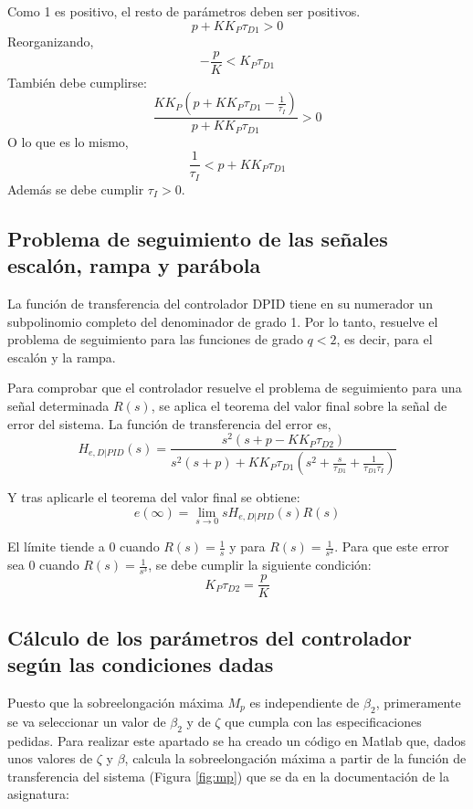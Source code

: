 \documentclass[a4paper]{article}
\begin{document}
Como 1 es positivo, el resto de parámetros deben ser positivos.
\begin{equation}
	p+K K_P \tau_{D1}>0
\end{equation}
Reorganizando,
\begin{equation}
	-\frac{p}{K}<K_P \tau_{D1}
	\label{eq:2}
\end{equation}
También debe cumplirse:
\begin{equation}
	\frac{K K_P (p+K K_P \tau_{D1} -\frac{1}{\tau_I})}{p+K K_P \tau_{D1}} > 0
\end{equation}
O lo que es lo mismo,
\begin{equation}
	\frac{1}{\tau_I} < p+K K_P \tau_{D1}
	\label{eq:3}
\end{equation}
Además se debe cumplir $\tau_I > 0$.

\subsection{Problema de seguimiento de las señales escalón, rampa y parábola}
La función de transferencia del controlador D\textbar PID tiene en su numerador un subpolinomio completo del denominador de grado 1. Por lo tanto, resuelve el problema de seguimiento para las funciones de grado $q<2$, es decir, para el escalón y la rampa.

Para comprobar que el controlador resuelve el problema de seguimiento para una señal determinada $R(s)$, se aplica el teorema del valor final sobre la señal de error del sistema.
La función de transferencia del error es,
\begin{equation}
	H_{e, D|PID}(s)=\frac{s^2(s+p-K K_P \tau_{D2})}{s^2(s+p)+K K_P \tau_{D1}(s^2+\frac{s}{\tau_{D1}}+\frac{1}{\tau_{D1} \tau_I})}
\end{equation}

Y tras aplicarle el teorema del valor final se obtiene:
\begin{equation}
	e(\infty)=\lim_{s \rightarrow 0}
	s H_{e, D|PID}(s) R(s)
\end{equation}

El límite tiende a 0 cuando $R(s)=\frac{1}{s}$ y para $R(s)=\frac{1}{s^2}$. Para que este error sea $0$ cuando $R(s)=\frac{1}{s^3}$, se debe cumplir la siguiente condición:
\begin{equation}
K_P \tau_{D2} = \frac{p}{K}
\end{equation}

\subsection{Cálculo de los parámetros del controlador según las condiciones dadas}
Puesto que la sobreelongación máxima $M_p$ es independiente de $\beta_2$, primeramente se va seleccionar un valor de $\beta_2$ y de $\zeta$ que cumpla con las especificaciones pedidas.
Para realizar este apartado se ha creado un código en Matlab que, dados unos valores de $\zeta$ y $\beta$, calcula la sobreelongación máxima a partir de la función de transferencia del sistema (Figura \ref{fig:mp}) que se da en la documentación de la asignatura:
\end{document}
